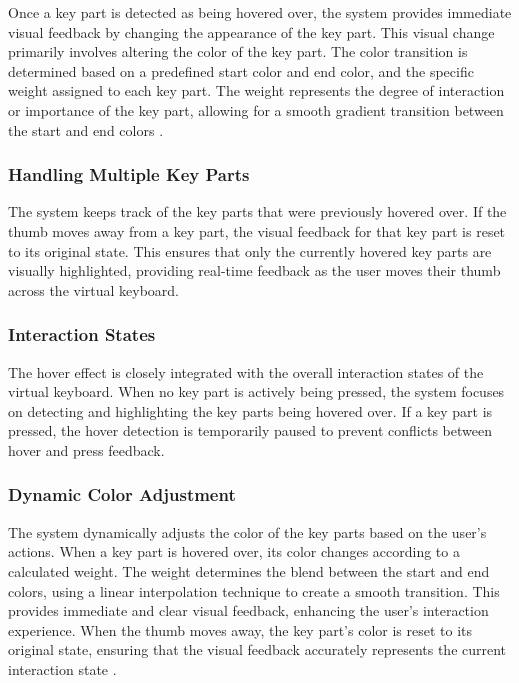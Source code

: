 Once a key part is detected as being hovered over, the system provides immediate visual feedback by changing the appearance of the key part. This visual change primarily involves altering the color of the key part. The color transition is determined based on a predefined start color and end color, and the specific weight assigned to each key part. The weight represents the degree of interaction or importance of the key part, allowing for a smooth gradient transition between the start and end colors \cite{douglas1999impact} .

\subsubsection{Handling Multiple Key Parts}

The system keeps track of the key parts that were previously hovered over. If the thumb moves away from a key part, the visual feedback for that key part is reset to its original state. This ensures that only the currently hovered key parts are visually highlighted, providing real-time feedback as the user moves their thumb across the virtual keyboard.

\subsubsection{Interaction States}

The hover effect is closely integrated with the overall interaction states of the virtual keyboard. When no key part is actively being pressed, the system focuses on detecting and highlighting the key parts being hovered over. If a key part is pressed, the hover detection is temporarily paused to prevent conflicts between hover and press feedback.

\subsubsection{Dynamic Color Adjustment}

The system dynamically adjusts the color of the key parts based on the user's actions. When a key part is hovered over, its color changes according to a calculated weight. The weight determines the blend between the start and end colors, using a linear interpolation technique to create a smooth transition. This provides immediate and clear visual feedback, enhancing the user's interaction experience. When the thumb moves away, the key part's color is reset to its original state, ensuring that the visual feedback accurately represents the current interaction state \cite{bolt1980put}.

